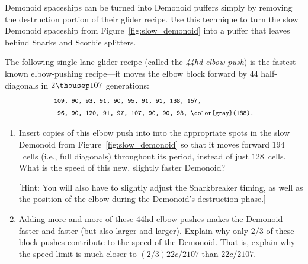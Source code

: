 \begin{multicols}{2}
	
	\begin{problem}\label{exer:demonoid_turn_into_puffer} 
		Demonoid spaceships can be turned into Demonoid puffers simply by removing the destruction portion of their glider recipe. Use this technique to turn the slow Demonoid spaceship from Figure~\ref{fig:slow_demonoid} into a puffer that leaves behind Snarks and Scorbie splitters.
	\end{problem}
	
	
	\mfilbreak
	
	
	\begin{problemstar}\label{exer:44hd_elbow_push} 
		The following single-lane glider recipe (called the \emph{44hd elbow push}) is the fastest-known elbow-pushing recipe---it moves the elbow block forward by $44$ half-diagonals in $2{\thousep}107$ generations:
		\begin{align*}
		& \text{\texttt{\footnotesize 109, 90, 93, 91, 90, 95, 91, 91, 138, 157,}} \\
		& \text{\texttt{\footnotesize~96, 90, 120, 91, 97, 107, 90, 90, 93, {\color{gray}(188)}.}}
		\end{align*}
		
		\begin{center}
			\centering
		\end{center}
		
		\begin{enumerate}[label=\bf\color{ocre}(\alph*)]
			\item Insert copies of this elbow push into into the appropriate spots in the slow Demonoid from Figure~\ref{fig:slow_demonoid} so that it moves forward $194$~cells (i.e., full diagonals) throughout its period, instead of just $128$~cells. What is the speed of this new, slightly faster Demonoid?
			
			[Hint: You will also have to slightly adjust the Snarkbreaker timing, as well as the position of the elbow during the Demonoid's destruction phase.]
			
			\item Adding more and more of these 44hd elbow pushes makes the Demonoid faster and faster (but also larger and larger). Explain why only $2/3$ of these block pushes contribute to the speed of the Demonoid. That is, explain why the speed limit is much closer to $(2/3)22c/2107$ than $22c/2107$.
			

\end{enumerate}
\end{problemstar}
\end{multicols}
